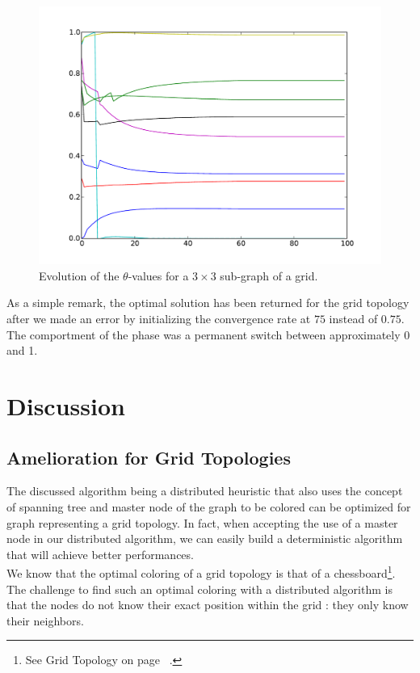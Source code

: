 \documentclass[letterpaper]{article}
\begin{document}
\begin{figure}[h]
\centering
\includegraphics[scale=0.4]{./Figures/grid_conv.pdf}
\caption{Evolution of the $\theta$-values for a $3 \times 3$ sub-graph of a grid.} \label{fig:GridConv}
\end{figure}

As a simple remark, the optimal solution has been returned for the grid topology after we made an error by initializing the convergence rate at $75$ instead of $0.75$. The comportment of the phase was a permanent switch between approximately 0 and 1.

\section{Discussion}

\subsection{Amelioration for Grid Topologies}
The discussed algorithm being a distributed heuristic that also uses the concept of spanning tree and master node of the graph to be colored can be optimized for graph representing a grid topology. In fact, when accepting the use of a master node in our distributed algorithm, we can easily build a deterministic algorithm that will achieve better performances.\\

We know that the optimal coloring of a grid topology is that of a chessboard\footnote{See Grid Topology on page ~\pageref{subsec:gridtopology}.}. The challenge to find such an optimal coloring with a distributed algorithm is that the nodes do not know their exact position within the grid : they only know their neighbors.\\
\end{document}
